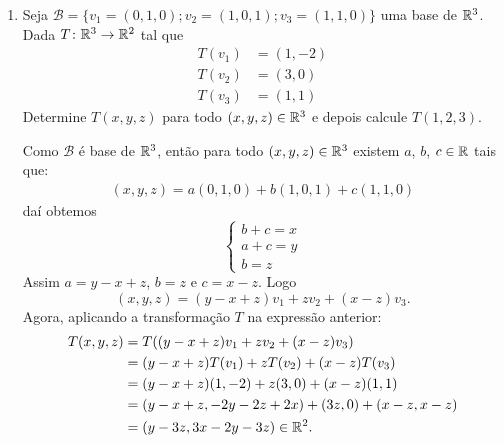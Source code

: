 \begin{exemplos}
    \begin{enumerate}[label={\arabic*})]
        \item Seja $\mathcal{B} = \{v_1 = (0, 1, 0); v_2 = (1, 0, 1); v_3 = (1, 1, 0)\}$ uma base de $\mathbb{R}^3$. Dada $T \colon \mathbb{R}^3 \to \mathbb{R}^2$ tal que
        \begin{align*}
            T(v_1) &= (1, -2)\\
            T(v_2) &= (3, 0)\\
            T(v_3) &= (1, 1)
        \end{align*}
        Determine $T(x, y, z)$ para todo $(x, y, z) \in \mathbb{R}^3$ e depois calcule $T(1, 2, 3)$.
        \begin{solucao}
            Como $\mathcal{B}$ é base de $\mathbb{R}^3$, então para todo $(x, y, z) \in \mathbb{R}^3$ existem $a$, $b$, $c \in \mathbb{R}$ tais que:
            \begin{align*}
                (x, y, z) = a(0, 1, 0) + b(1, 0, 1) + c(1, 1, 0)
            \end{align*}
            daí obtemos
            \[
                \begin{cases}
                    b + c = x\\
                    a + c = y\\
                    b = z
                \end{cases}
            \]
            Assim $a = y - x + z$, $b = z$ e $c = x - z$. Logo
            \[
                (x, y, z) = (y - x + z)v_1 + zv_2 + (x - z)v_3.
            \]
            Agora, aplicando a transformação $T$ na expressão anterior:
            \begin{align*}
                T(x, y, z) &= T((y - x + z)v_1 + zv_2 + (x - z)v_3) \\ &= (y - x + z)T(v_1) + zT(v_2) + (x - z)T(v_3) \\ &= (y - x + z)(1, -2) + z(3, 0) + (x - z)(1, 1) \\ &= (y - x + z, -2y - 2z + 2x) + (3z, 0) + (x - z, x - z) \\ &= (y - 3z, 3x - 2y - 3z) \in \mathbb{R}^2.
            \end{align*}


\end{solucao}
\end{enumerate}
\end{exemplos}
